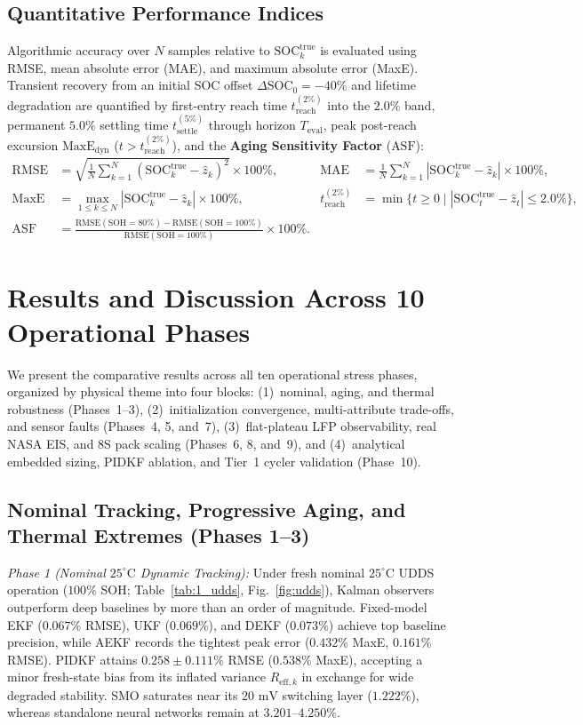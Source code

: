 \documentclass[10pt,a4paper]{article}
\begin{document}
\subsection{Quantitative Performance Indices}
Algorithmic accuracy over $N$ samples relative to $\text{SOC}_k^{\text{true}}$ is evaluated using RMSE, mean absolute error (MAE), and maximum absolute error (MaxE). Transient recovery from an initial SOC offset $\Delta\text{SOC}_0 = -40\%$ and lifetime degradation are quantified by first-entry reach time $t_{\text{reach}}^{(2\%)}$ into the $2.0\%$ band, permanent $5.0\%$ settling time $t_{\text{settle}}^{(5\%)}$ through horizon $T_{\text{eval}}$, peak post-reach excursion $\text{MaxE}_{\text{dyn}}$ ($t > t_{\text{reach}}^{(2\%)}$), and the \textbf{Aging Sensitivity Factor} ($\text{ASF}$):
\begin{align}
\text{RMSE} &= \sqrt{\tfrac{1}{N}\textstyle\sum_{k=1}^N (\text{SOC}_k^{\text{true}} - \hat{z}_k)^2} \times 100\%, &
\text{MAE} &= \tfrac{1}{N}\textstyle\sum_{k=1}^N |\text{SOC}_k^{\text{true}} - \hat{z}_k| \times 100\%, \label{eqn:mae}\\
\text{MaxE} &= \max_{1 \le k \le N} |\text{SOC}_k^{\text{true}} - \hat{z}_k| \times 100\%, &
t_{\text{reach}}^{(2\%)} &= \min\{ t \ge 0 \mid |\text{SOC}_t^{\text{true}} - \hat{z}_t| \le 2.0\% \}, \label{eqn:treach}\\
\text{ASF} &= \frac{\text{RMSE}(\text{SOH}=80\%) - \text{RMSE}(\text{SOH}=100\%)}{\text{RMSE}(\text{SOH}=100\%)} \times 100\%. \label{eqn:asf}
\end{align}

\section{Results and Discussion Across 10 Operational Phases}
We present the comparative results across all ten operational stress phases, organized by physical theme into four blocks: (1)~nominal, aging, and thermal robustness (Phases~1--3), (2)~initialization convergence, multi-attribute trade-offs, and sensor faults (Phases~4, 5, and~7), (3)~flat-plateau LFP observability, real NASA EIS, and 8S pack scaling (Phases~6, 8, and~9), and (4)~analytical embedded sizing, PIDKF ablation, and Tier~1 cycler validation (Phase~10).

\subsection{Nominal Tracking, Progressive Aging, and Thermal Extremes (Phases 1--3)}
\emph{Phase 1 (Nominal $25^\circ\text{C}$ Dynamic Tracking):} Under fresh nominal $25^\circ\text{C}$ UDDS operation ($100\%$ SOH; Table~\ref{tab:1_udds}, Fig.~\ref{fig:udds}), Kalman observers outperform deep baselines by more than an order of magnitude. Fixed-model EKF ($0.067\%$ RMSE), UKF ($0.069\%$), and DEKF ($0.073\%$) achieve top baseline precision, while AEKF records the tightest peak error ($0.432\%$ MaxE, $0.161\%$ RMSE). PIDKF attains $0.258\pm0.111\%$ RMSE ($0.538\%$ MaxE), accepting a minor fresh-state bias from its inflated variance $R_{\text{eff},k}$ in exchange for wide degraded stability. SMO saturates near its $20\text{ mV}$ switching layer ($1.222\%$), whereas standalone neural networks remain at $3.201\text{--}4.250\%$.
\end{document}

